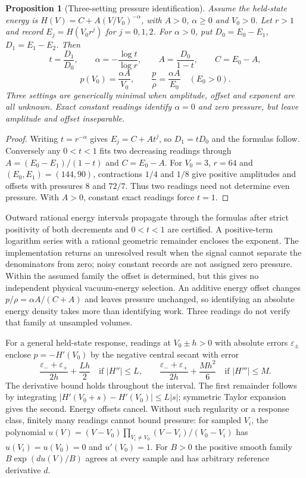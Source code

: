\documentclass[11pt]{article}
\newtheorem{proposition}[theorem]{Proposition}
\begin{document}
\begin{proposition}[Three-setting pressure identification]
Assume the held-state energy is
$H(V)=C+A(V/V_0)^{-\alpha}$, with $A>0$, $\alpha\ge0$ and $V_0>0$.
Let $r>1$ and record $E_j=H(V_0r^j)$ for $j=0,1,2$. For $\alpha>0$,
put $D_0=E_0-E_1$, $D_1=E_1-E_2$. Then
\[
 t=\frac{D_1}{D_0},\qquad
 \alpha=-\frac{\log t}{\log r},\qquad
 A=\frac{D_0}{1-t},\qquad C=E_0-A,
\]
\[
 p(V_0)=\frac{\alpha A}{V_0},\qquad
 \frac p\rho=\frac{\alpha A}{E_0}\quad(E_0>0).
\]
Three settings are generically minimal when amplitude, offset and exponent
are all unknown. Exact constant readings identify $\alpha=0$ and zero
pressure, but leave amplitude and offset inseparable.
\end{proposition}
\begin{proof}
Writing $t=r^{-\alpha}$ gives $E_j=C+At^j$, so
$D_1=tD_0$ and the formulas follow. Conversely any $0<t<1$ fits two
decreasing readings through $A=(E_0-E_1)/(1-t)$ and $C=E_0-A$.
For $V_0=3$, $r=64$ and $(E_0,E_1)=(144,90)$, contractions $1/4$
and $1/8$ give positive amplitudes and offsets with pressures $8$ and
$72/7$. Thus two readings need not determine even pressure. With
$A>0$, constant exact readings force $t=1$.
\end{proof}

Outward rational energy intervals propagate through the formulas after
strict positivity of both decrements and $0<t<1$ are certified. A
positive-term logarithm series with a rational geometric remainder
encloses the exponent. The implementation returns an unresolved result
when the signal cannot separate the denominators from zero; noisy constant
records are not assigned zero pressure. Within the assumed family the
offset is determined, but this gives no independent physical vacuum-energy
selection. An additive energy offset changes $p/\rho=\alpha A/(C+A)$ and leaves
pressure unchanged, so identifying an absolute energy density takes more than
identifying work. Three readings do not verify that family at unsampled volumes.

For a general held-state response, readings at $V_0\pm h>0$ with absolute
errors $\varepsilon_\pm$ enclose $p=-H'(V_0)$ by the negative central
secant with error
\[
 \frac{\varepsilon_-+\varepsilon_+}{2h}
 +\frac{Lh}{2}\quad\text{if }|H''|\le L,
 \qquad
 \frac{\varepsilon_-+\varepsilon_+}{2h}
 +\frac{Mh^2}{6}\quad\text{if }|H'''|\le M.
\]
The derivative bound holds throughout the interval. The first remainder
follows by integrating $|H'(V_0+s)-H'(V_0)|\le L|s|$; symmetric
Taylor expansion gives the second. Energy offsets cancel. Without such
regularity or a response class, finitely many readings cannot bound
pressure: for sampled $V_i$, the polynomial
$u(V)=(V-V_0)\prod_{V_i\ne V_0}(V-V_i)/(V_0-V_i)$ has
$u(V_i)=u(V_0)=0$ and $u'(V_0)=1$. For $B>0$ the positive smooth
family $B\exp(du(V)/B)$ agrees at every sample and has arbitrary
reference derivative $d$.
\end{document}
